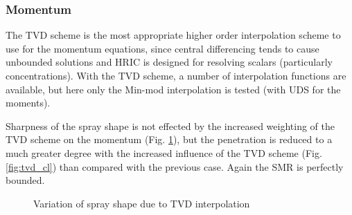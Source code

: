 \documentclass[a4paper,10pt]{article}
\begin{document}
\subsubsection{Momentum}
The TVD scheme is the most appropriate higher order interpolation scheme to use for the momentum equations, since central differencing tends to cause unbounded solutions and HRIC is designed for resolving scalars (particularly concentrations). With the TVD scheme, a number of interpolation functions are available, but here only the Min-mod interpolation is tested (with UDS for the moments).

Sharpness of the spray shape is not effected by the increased weighting of the TVD scheme on the momentum (Fig. \ref{fig:tvd}), but the penetration is reduced to a much greater degree with the increased influence of the TVD scheme (Fig. \ref{fig:tvd_cl}) than compared with the previous case. Again the SMR is perfectly bounded.
\begin{figure}[H]
\centering
{}
\caption{Variation of spray shape due to TVD interpolation}
\label{fig:tvd}
\end{figure}
\end{document}
